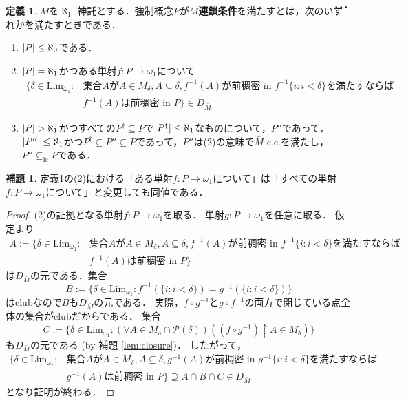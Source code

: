 \documentclass[uplatex]{jsarticle}
\newcommand{\Pow}{\mathcal{P}}
\newcommand{\restrict}{\upharpoonright}
\newcommand{\Limone}{\mathrm{Lim}_{\omega_1}}
\newcommand{\subsetic}{\subseteq_{\mathrm{ic}}}
\DeclarePairedDelimiter\abs{\lvert}{\rvert}
\renewcommand\subset{\subseteq}
\theoremstyle{definition}
\newtheorem{defi}[thm]{定義}
\newtheorem{lem}[thm]{補題}
\begin{document}
	\begin{defi}\label{def:oraclecc}
		$\bar{M}$を$\aleph_1$-神託とする．強制概念$P$が\textbf{$\bar{M}$連鎖条件}を満たすとは，次の\.い\.ず\.れ\.かを満たすときである．
		\begin{enumerate}
			\item $\abs{P} \le \aleph_0$である．
			\item $\abs{P} = \aleph_1$かつある単射$f \colon P \to \omega_1$について
			\begin{align*}
			\{ \delta \in \Limone : &\text{集合}A\text{が}A \in M_\delta, A \subset \delta, \text{$f^{-1}(A)$が前稠密 in $f^{-1}\{i : i < \delta\}$を満たすならば} \\
			&\text{$f^{-1}(A)$は前稠密 in $P$} \} \in D_{\bar{M}}
			\end{align*}
			\item $\abs{P} > \aleph_1$かつすべての$P^\dagger \subset P$で$\abs{P^\dagger} \le \aleph_1$なものについて，$P''$であって，$\abs{P''} \le \aleph_1$かつ$P^\dagger \subset P'' \subset P$であって，$P''$は(2)の意味で$\bar{M}$-c.c.を満たし，$P'' \subsetic P$である．
		\end{enumerate}
	\end{defi}

	\begin{lem}
		定義\ref{def:oraclecc}の(2)における「ある単射$f \colon P \to \omega_1$について」は「すべての単射$f \colon P \to \omega_1$について」と変更しても同値である．
	\end{lem}
	\begin{proof}
		(2)の証拠となる単射$f \colon P \to \omega_1$を取る．
		単射$g \colon P \to \omega_1$を任意に取る．
		仮定より
		\begin{align*}
		A := \{ \delta \in \Limone : &\text{集合}A\text{が}A \in M_\delta, A \subset \delta, \text{$f^{-1}(A)$が前稠密 in $f^{-1}\{i : i < \delta\}$を満たすならば} \\
		&\text{$f^{-1}(A)$は前稠密 in $P$} \}
		\end{align*}
		は$D_{\bar{M}}$の元である．集合
		\[
		B := \{ \delta \in \Limone : f^{-1}(\{i : i < \delta\}) = g^{-1}(\{i : i < \delta\})\}
		\]
		はclubなので$B$も$D_{\bar{M}}$の元である．
		実際，$f \circ g^{-1}$と$g \circ f^{-1}$の両方で閉じている点全体の集合がclubだからである．
		集合
		\[
		C := \{ \delta \in \Limone : (\forall A \in M_\delta \cap \Pow(\delta)) ((f \circ g^{-1}) \restrict A \in M_\delta) \}
		\]
		も$D_{\bar{M}}$の元である (by 補題 \ref{lem:closure})．
		したがって，
		\begin{align*}
			\{ \delta \in \Limone : &\text{集合}A\text{が}A \in M_\delta, A \subset \delta, \text{$g^{-1}(A)$が前稠密 in $g^{-1}\{i : i < \delta\}$を満たすならば} \\
			&\text{$g^{-1}(A)$は前稠密 in $P$} \} \supseteq A \cap B \cap C \in D_{\bar{M}}
		\end{align*}
		となり証明が終わる．
	\end{proof}
\end{document}
